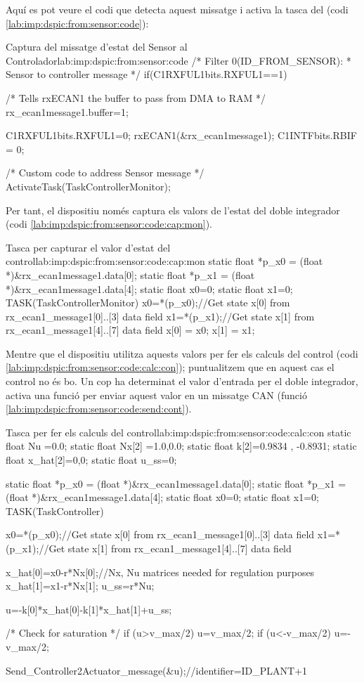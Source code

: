 Aquí es pot veure el codi que detecta aquest missatge i activa la tasca del \Monitor (codi \ref{lab:imp:dspic:from:sensor:code}):

\begin{code_c}{Captura del missatge d'estat del Sensor al Controlador}{lab:imp:dspic:from:sensor:code}
/* Filter 0(ID_FROM_SENSOR):
 * Sensor to controller message */
if(C1RXFUL1bits.RXFUL1==1)
{
	/* Tells rxECAN1 the buffer to pass from DMA to RAM */
	rx_ecan1message1.buffer=1;

	C1RXFUL1bits.RXFUL1=0;
    rxECAN1(&rx_ecan1message1);
	C1INTFbits.RBIF = 0;

	/* Custom code to address Sensor message */
    ActivateTask(TaskControllerMonitor);
}
\end{code_c}

Per tant, el dispositiu \Monitor només captura els valors de l'estat del doble integrador (codi \ref{lab:imp:dspic:from:sensor:code:cap:mon}).

\begin{code_c}{Tasca per capturar el valor d'estat del control}{lab:imp:dspic:from:sensor:code:cap:mon}
static float *p_x0 = (float *)&rx_ecan1message1.data[0];
static float *p_x1 = (float *)&rx_ecan1message1.data[4];
static float x0=0;
static float x1=0;
TASK(TaskControllerMonitor)
{
	x0=*(p_x0);//Get state x[0] from rx_ecan1_message1[0]..[3] data field
	x1=*(p_x1);//Get state x[1] from rx_ecan1_message1[4]..[7] data field
	x[0] = x0;
	x[1] = x1;
}
\end{code_c}

Mentre que el dispositiu \Controlador utilitza aquests valors per fer els calculs del control (codi \ref{lab:imp:dspic:from:sensor:code:calc:con}); puntualitzem que en aquest cas el control no és bo. Un cop ha determinat el valor d'entrada per el doble integrador, activa una funció per enviar aquest valor en un missatge CAN (funció \ref{lab:imp:dspic:from:sensor:code:send:cont}).

\begin{code_c}{Tasca per fer els calculs del control}{lab:imp:dspic:from:sensor:code:calc:con}
static float Nu =0.0;
static float Nx[2] ={1.0,0.0};
static float k[2]={0.9834 ,  -0.8931};
static float x_hat[2]={0,0};
static float u_ss=0;

static float *p_x0 = (float *)&rx_ecan1message1.data[0];
static float *p_x1 = (float *)&rx_ecan1message1.data[4];
static float x0=0;
static float x1=0;
TASK(TaskController)
{
	x0=*(p_x0);//Get state x[0] from rx_ecan1_message1[0]..[3] data field
	x1=*(p_x1);//Get state x[1] from rx_ecan1_message1[4]..[7] data field

	x_hat[0]=x0-r*Nx[0];//Nx, Nu matrices needed for regulation purposes
	x_hat[1]=x1-r*Nx[1];
	u_ss=r*Nu;

	u=-k[0]*x_hat[0]-k[1]*x_hat[1]+u_ss;

	/* Check for saturation */
	if (u>v_max/2) u=v_max/2;
	if (u<-v_max/2) u=-v_max/2;

	Send_Controller2Actuator_message(&u);//identifier=ID_PLANT+1
}
\end{code_c}

